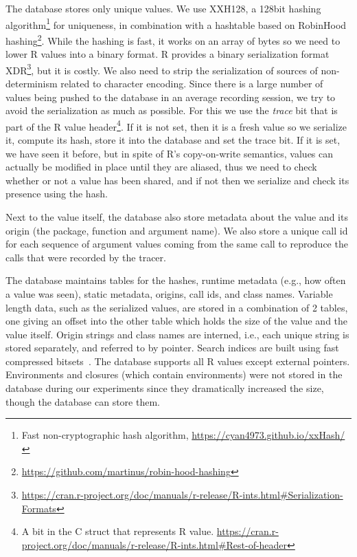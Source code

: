 \documentclass[sigplan,anonymous,review]{acmart}
\begin{document}
The database stores only unique values.
We use XXH128, a 128bit hashing algorithm\footnote{Fast non-cryptographic hash algorithm, \Cf \url{https://cyan4973.github.io/xxHash/}} for uniqueness, in combination with a hashtable based on RobinHood hashing\footnote{\url{https://github.com/martinus/robin-hood-hashing}}.
While the hashing is fast, it works on an array of bytes so we need to lower R values into a binary format.
R provides a binary serialization format XDR\footnote{\Cf \url{https://cran.r-project.org/doc/manuals/r-release/R-ints.html\#Serialization-Formats}}, but it is costly. We also need to strip the serialization of sources of non-determinism related to character encoding.
Since there is a large number of values being pushed to the database in an average recording session, we try to avoid the serialization as much as possible.
For this we use the \emph{trace} bit that is part of the R value header\footnote{A bit in the  C struct that represents R value. \Cf \url{https://cran.r-project.org/doc/manuals/r-release/R-ints.html\#Rest-of-header}}.
If it is not set, then it is a fresh value so we serialize it, compute its hash, store it into the database and set the trace bit.
If it is set, we have seen it before, but in spite of R's copy-on-write semantics, values can actually be modified in place until they are aliased, thus we need to check whether or not a value has been shared, and if not then we serialize and check its presence using the hash.


Next to the value itself, the database also store metadata about the value and its origin (the package, function and argument name).
We also store a unique call id for each sequence of argument values coming from the same call to reproduce the calls that were recorded by the tracer.

The database maintains tables for the hashes, runtime metadata (e.g., how often a value was seen), static metadata, origins, call ids, and class names. 
Variable length data, such as the serialized values, are stored in a combination of 2 tables, one giving an offset into the other table which holds the size of the value and the value itself. 
Origin strings and class names are interned, i.e., each unique string is stored separately, and referred to by pointer. 
Search indices are built using fast compressed bitsets~\cite{chambi2016better}.
The database supports all R values except external pointers.
Environments and closures (which contain environments) were not stored in the database during our experiments since they dramatically increased the size, though the database can store them.
\end{document}
